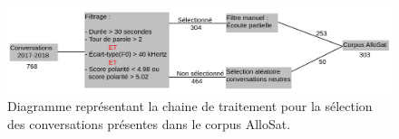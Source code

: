 \begin{figure}[h]
  \centering
  \includegraphics[width=\textwidth]{./Chapitre4/figures/diagchoix.png}
  \caption{Diagramme représentant la chaine de traitement pour la sélection des conversations présentes dans le corpus AlloSat.}
  \label{fig:diagchoix}
\end{figure}
